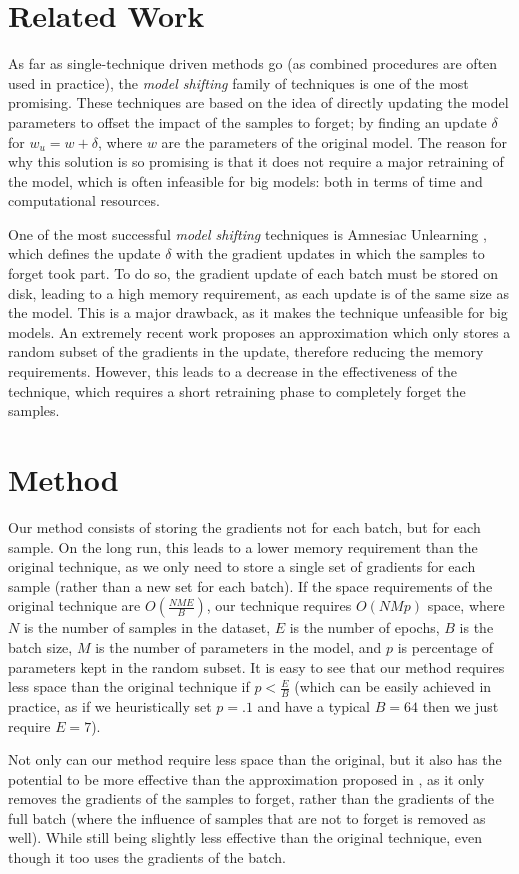\documentclass{article}
\begin{document}
\section{Related Work}
As far as single-technique driven methods go (as combined procedures are often used in practice), the \emph{model shifting} \cite{vatter2023evolution} family of techniques is one of the most promising. These techniques are based on the idea of directly updating the model parameters to offset the impact of the samples to forget; by finding an update $\delta$ for $w_u=w+\delta$, where $w$ are the parameters of the original model. The reason for why this solution is so promising is that it does not require a major retraining of the model, which is often infeasible for big models: both in terms of time and computational resources.

One of the most successful \emph{model shifting} techniques is Amnesiac Unlearning \cite{graves2021amnesiac}, which defines the update $\delta$ with the gradient updates in which the samples to forget took part. To do so, the gradient update of each batch must be stored on disk, leading to a high memory requirement, as each update is of the same size as the model. This is a major drawback, as it makes the technique unfeasible for big models.
An extremely recent work \cite{gogineni2024efficient} proposes an approximation which only stores a random subset of the gradients in the update, therefore reducing the memory requirements. However, this leads to a decrease in the effectiveness of the technique, which requires a short retraining phase to completely forget the samples.

\section{Method}
Our method consists of storing the gradients not for each batch, but for each sample. On the long run, this leads to a lower memory requirement than the original technique, as we only need to store a single set of gradients for each sample (rather than a new set for each batch). If the space requirements of the original technique are $O(\frac{NME}{B})$, our technique requires $O(NMp)$ space, where $N$ is the number of samples in the dataset, $E$ is the number of epochs, $B$ is the batch size, $M$ is the number of parameters in the model, and $p$ is percentage of parameters kept in the random subset. It is easy to see that our method requires less space than the original technique if $p<\frac{E}{B}$ (which can be easily achieved in practice, as if we heuristically set $p=.1$ and have a typical $B=64$ then we just require $E=7$).

Not only can our method require less space than the original, but it also has the potential to be more effective than the approximation proposed in \cite{gogineni2024efficient}, as it only removes the gradients of the samples to forget, rather than the gradients of the full batch (where the influence of samples that are not to forget is removed as well). While still being slightly less effective than the original technique, even though it too uses the gradients of the batch.



\end{document}
